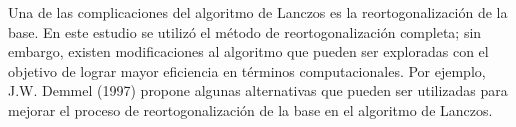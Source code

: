 Una de las complicaciones del algoritmo de Lanczos es la reortogonalización de la base. En este estudio se utilizó el método de reortogonalización completa; sin embargo, existen modificaciones al algoritmo que pueden ser exploradas con el objetivo de lograr mayor eficiencia en términos computacionales. Por ejemplo, J.W. Demmel (1997) \cite{demmel1997applied} propone algunas alternativas que pueden ser utilizadas para mejorar el proceso de reortogonalización de la base en el algoritmo de Lanczos.



